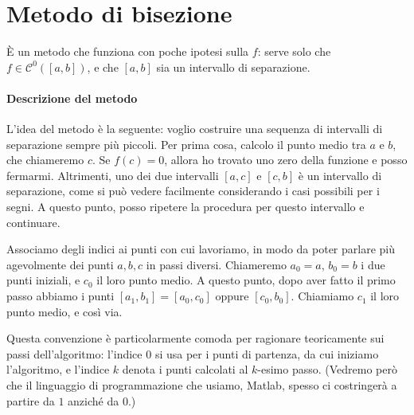 \documentclass[a4paper]{report}
\theoremstyle{definition}
\theoremstyle{remark}
\begin{document}
\section{Metodo di bisezione}

È un metodo che funziona con poche ipotesi sulla $f$: serve solo che $f \in \mathcal{C}^0([a,b])$, e che $[a,b]$ sia un intervallo di separazione.

\paragraph{Descrizione del metodo} L'idea del metodo è la seguente: voglio costruire una sequenza di intervalli di separazione sempre più piccoli. Per prima cosa, calcolo il punto medio tra $a$ e $b$, che chiameremo $c$. Se $f(c) = 0$, allora ho trovato uno zero della funzione e posso fermarmi. Altrimenti, uno dei due intervalli $[a,c]$ e $[c,b]$ è un intervallo di separazione, come si può vedere facilmente considerando i casi possibili per i segni. A questo punto, posso ripetere la procedura per questo intervallo e continuare.

\begin{center}
\end{center}

Associamo degli indici ai punti con cui lavoriamo, in modo da poter parlare più agevolmente dei punti $a,b,c$ in passi diversi. Chiameremo $a_0 = a$, $b_0=b$ i due punti iniziali, e $c_0$ il loro punto medio. A questo punto, dopo aver fatto il primo passo abbiamo i punti $[a_1,b_1] = [a_0,c_0]$ oppure $[c_0,b_0]$. Chiamiamo $c_1$ il loro punto medio, e così via.

Questa convenzione è particolarmente comoda per ragionare teoricamente sui passi dell'algoritmo: l'indice $0$ si usa per i punti di partenza, da cui iniziamo l'algoritmo, e l'indice $k$ denota i punti calcolati al $k$-esimo passo. (Vedremo però che il linguaggio di programmazione che usiamo, Matlab, spesso ci costringerà a partire da $1$ anziché da $0$.)
\end{document}
